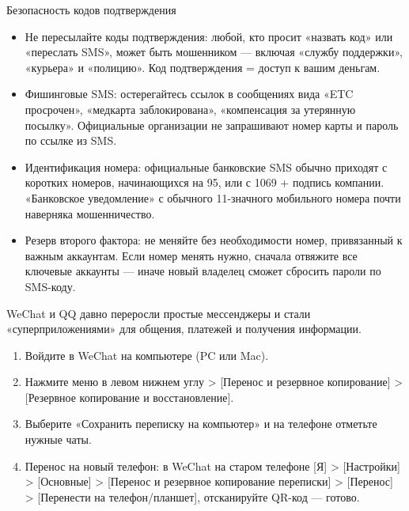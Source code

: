 \begin{tcbwarn}{Безопасность кодов подтверждения}
\begin{itemize}
  \item Не пересылайте коды подтверждения: любой, кто просит «назвать код» или «переслать SMS», может быть мошенником — включая «службу поддержки», «курьера» и «полицию». Код подтверждения = доступ к вашим деньгам.
  \item Фишинговые SMS: остерегайтесь ссылок в сообщениях вида «ETC просрочен», «медкарта заблокирована», «компенсация за утерянную посылку». Официальные организации не запрашивают номер карты и пароль по ссылке из SMS.
  \item Идентификация номера: официальные банковские SMS обычно приходят с коротких номеров, начинающихся на 95, или с 1069 + подпись компании. «Банковское уведомление» с обычного 11-значного мобильного номера почти наверняка мошенничество.
  \item Резерв второго фактора: не меняйте без необходимости номер, привязанный к важным аккаунтам. Если номер менять нужно, сначала отвяжите все ключевые аккаунты — иначе новый владелец сможет сбросить пароли по SMS-коду.
\end{itemize}

\end{tcbwarn}


WeChat и QQ давно переросли простые мессенджеры и стали «суперприложениями» для общения, платежей и получения информации.


\begin{enumerate}
  \item Войдите в WeChat на компьютере (PC или Mac).
  \item Нажмите меню в левом нижнем углу > [Перенос и резервное копирование] > [Резервное копирование и восстановление].
  \item Выберите «Сохранить переписку на компьютер» и на телефоне отметьте нужные чаты.
  \item Перенос на новый телефон: в WeChat на старом телефоне [Я] > [Настройки] > [Основные] > [Перенос и резервное копирование переписки] > [Перенос] > [Перенести на телефон/планшет], отсканируйте QR-код — готово.
\end{enumerate}



